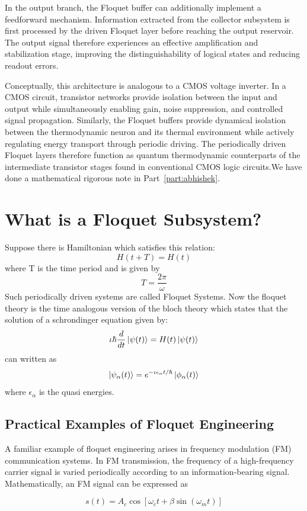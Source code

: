\documentclass[11pt,a4paper]{article}
\theoremstyle{definition}
\theoremstyle{remark}
\begin{document}
In the output branch, the Floquet buffer can additionally implement a feedforward mechanism. Information extracted from the collector subsystem is first processed by the driven Floquet layer before reaching the output reservoir. The output signal therefore experiences an effective amplification and stabilization stage, improving the distinguishability of logical states and reducing readout errors.

Conceptually, this architecture is analogous to a CMOS voltage inverter. In a CMOS circuit, transistor networks provide isolation between the input and output while simultaneously enabling gain, noise suppression, and controlled signal propagation. Similarly, the Floquet buffers provide dynamical isolation between the thermodynamic neuron and its thermal environment while actively regulating energy transport through periodic driving. The periodically driven Floquet layers therefore function as quantum thermodynamic counterparts of the intermediate transistor stages found in conventional CMOS logic circuits.We have done a mathematical rigorous note in Part~\ref{part:abhishek}.

\section{What is a 
Floquet Subsystem?}

Suppose there is Hamiltonian which satisfies this relation:
\[
H(t+T) = H(t)
\]
where T is the time period and is given by 
\[
T = \frac{2\pi}{\omega}
\]
Such periodically driven systems are called Floquet Systems.
Now the floquet theory is the time analogous version of the bloch theory which states that the solution of a schrondinger equation given by:
\[
\iota\hbar\frac{d}{dt}\ket{\psi(t)} = H(t)\ket{\psi(t)}
\]
can written as 
\[
\ket{\psi_\alpha(t)} = e^{-\iota \epsilon_\alpha t / \hbar}\ket{\phi_\alpha(t)}
\] where 
\(
\epsilon_\alpha 
\) is the quasi energies. 
\subsection{Practical Examples of Floquet Engineering}\label{sec:floquet-examples}
A familiar example of floquet engineering arises in frequency modulation (FM) communication systems. In FM transmission, the frequency of a high-frequency carrier signal is varied periodically according to an information-bearing signal. Mathematically, an FM signal can be expressed as

\[
s(t)=A_c\cos\left[\omega_c t+\beta \sin(\omega_m t)\right]
\]
\end{document}
